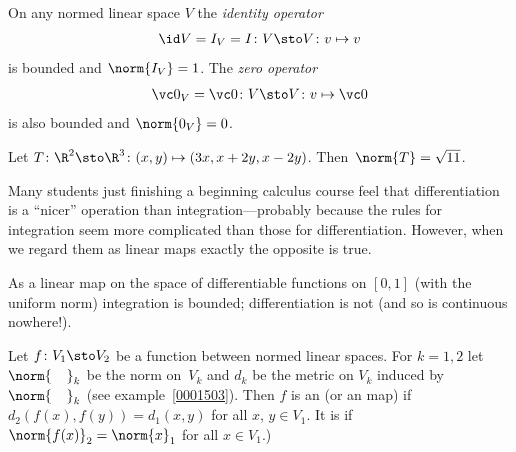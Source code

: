 \begin{exam} On any normed linear space $V$ the
\emph{identity operator}
   \[ \id V = I_V =I\colon V \sto V \colon v \mapsto v \] is bounded and $\norm{I_V} = 1$.  The
\emph{zero operator}
   \[ \vc 0_V = \vc 0\colon V \sto V\colon v \mapsto \vc 0 \]
is also bounded and $\norm{0_V} = 0$.
\end{exam}

\begin{exam} Let $T \colon \R^2 \sto \R^3\colon (x,y) \mapsto (3x, x + 2y, x - 2y)$.
Then~$\norm{T} = \sqrt{11}$.
\end{exam}

Many students just finishing a beginning calculus course feel that differentiation is a ``nicer'' operation
than integration---probably because the rules for integration seem more complicated than those for differentiation.
However, when we regard them as linear maps exactly the opposite is true.

\begin{exam} As a linear map on the space of differentiable functions on $[0,1]$ (with the uniform norm)
integration is bounded; differentiation is not (and so is continuous nowhere!).
\end{exam}


\begin{defn} Let $f\colon V_1 \sto V_2$ be a function between normed linear spaces.  For $k = 1,2$ let
$\norm{\hphantom{M}}_k$ be the norm on~$V_k$ and $d_k$ be the metric on $V_k$ induced
by~$\norm{\hphantom{M}}_k$ (see example~\ref{0001503}).  Then $f$ is an
 (or
an  map) if $d_2(f(x),f(y)) = d_1(x,y)$ for all $x$, $y \in V_1$.  It is
 if $\norm{f(x)}_2 = \norm{x}_1$ for all $x \in V_1$.)
\end{defn}

